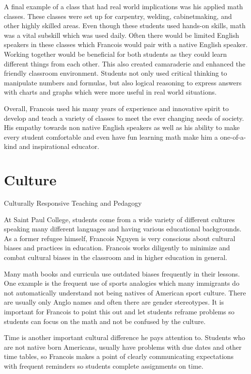 \documentclass[
]{book}
\begin{document}
A final example of a class that had real world implications was his applied math classes. These classes were set up for carpentry, welding, cabinetmaking, and other highly skilled areas. Even though these students used hands-on skills, math was a vital subskill which was used daily. Often there would be limited English speakers in these classes which Francois would pair with a native English speaker. Working together would be beneficial for both students as they could learn different things from each other. This also created camaraderie and enhanced the friendly classroom environment. Students not only used critical thinking to manipulate numbers and formulas, but also logical reasoning to express answers with charts and graphs which were more useful in real world situations.

Overall, Francois used his many years of experience and innovative spirit to develop and teach a variety of classes to meet the ever changing needs of society. His empathy towards non native English speakers as well as his ability to make every student comfortable and even have fun learning math make him a one-of-a-kind and inspirational educator.

\chapter{Culture}\label{culture}

Culturally Responsive Teaching and Pedagogy

At Saint Paul College, students come from a wide variety of different cultures speaking many different languages and having various educational backgrounds. As a former refugee himself, Francois Nguyen is very conscious about cultural biases and practices in education. Francois works diligently to minimize and combat cultural biases in the classroom and in higher education in general.

Many math books and curricula use outdated biases frequently in their lessons. One example is the frequent use of sports analogies which many immigrants do not automatically understand not being natives of American sport culture. There are usually only Anglo names and often there are gender stereotypes. It is important for Francois to point this out and let students reframe problems so students can focus on the math and not be confused by the culture.

Time is another important cultural difference he pays attention to. Students who are not native born Americans, usually have problems with due dates and other time tables, so Francois makes a point of clearly communicating expectations with frequent reminders so students complete assignments on time.
\end{document}
